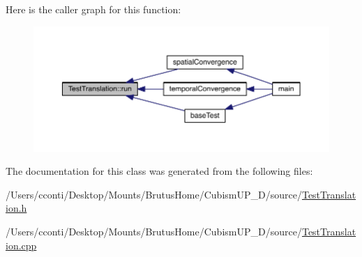 Here is the caller graph for this function\+:
\nopagebreak
\begin{figure}[H]
\begin{center}
\leavevmode
\includegraphics[width=350pt]{d5/d1e/class_test_translation_af97974ab98f8473705cf73a634854fab_icgraph}
\end{center}
\end{figure}




The documentation for this class was generated from the following files\+:\begin{DoxyCompactItemize}
\item 
/\+Users/cconti/\+Desktop/\+Mounts/\+Brutus\+Home/\+Cubism\+U\+P\+\_\+D/source/\hyperlink{_test_translation_8h}{Test\+Translation.\+h}\item 
/\+Users/cconti/\+Desktop/\+Mounts/\+Brutus\+Home/\+Cubism\+U\+P\+\_\+D/source/\hyperlink{_test_translation_8cpp}{Test\+Translation.\+cpp}\end{DoxyCompactItemize}
